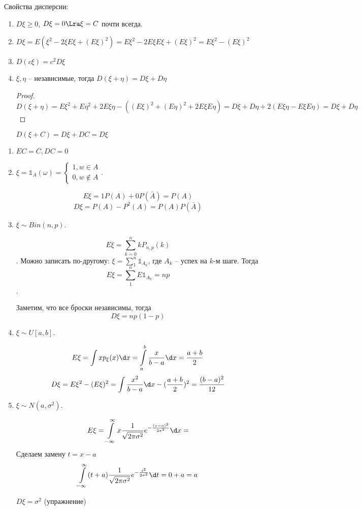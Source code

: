 Свойства дисперсии:
\begin{enumerate}
\item $D\xi \geq 0$, $D \xi = 0 \Lra \xi = C$ почти всегда. 

\item $D \xi = E (\xi ^2 - 2\xi E\xi + (E \xi) ^ 2) = E\xi^2 - 2E\xi E\xi + (E\xi) ^2 = E\xi^2 - (E\xi)^2$

\item $D(c \xi) = c^2 D \xi$

\item $\xi, \eta$ -- независимые, тогда $D(\xi + \eta) = D\xi + D\eta$
\begin{proof}
$$D(\xi + \eta) = E\xi^2 + E\eta^2 + 2E\xi\eta - ((E\xi)^2 + (E\eta)^2+ 2E\xi E\eta) = D\xi + D\eta + 2(E\xi \eta - E \xi E\eta) = D\xi + D\eta$$
\end{proof}
\begin{conseq}
$D(\xi + C) = D\xi + DC = D\xi$
\end{conseq}
\end{enumerate}

\begin{exmp}

\begin{enumerate}

\item $EC = C, DC = 0$
\item $\xi = \mathbb{1}_A(\omega) = \begin{cases} 1, w \in A \\ 0, w \notin A \end{cases}$.

$$E\xi = 1 P(A) + 0 P(\bar A) = P(A)$$
$$D\xi = P(A) - P^2(A) = P(A) P(\bar A)$$
\item $\xi \sim Bin(n, p)$. 

$$E\xi = \sum\limits_{k=0}^n k P_{n, p}(k)$$. 
Можно записать по-другому: $\xi = \sum\limits_1^n \mathbb{1}_{A_k}$, где $A_k$ -- успех на $k$-м шаге. Тогда $$E\xi = \sum\limits_1^n E \mathbb{1}_{A_k} = np$$.

Заметим, что все броски независимы, тогда 
$$D\xi = n p (1-p)$$

\item $\xi \sim U[a, b]$. 

$$E \xi = \int x p_\xi(x) \d x = \int\limits_a^b \frac{x}{b - a} \d x = \frac{a + b}{2}$$
$$D \xi = E\xi^2 - (E\xi)^2 = \int\frac{x^2}{b-a}\d x - (\frac{a + b}{2})^2 = \frac{(b - a)^2}{12}$$

\item
$\xi \sim N(a, \sigma^2)$.

$$E\xi = \int\limits_{-\infty}^{\infty} x \frac{1}{\sqrt{2\pi \sigma^2}} e^{-\frac{(x - a)^2}{2\sigma^2}} \d x = $$
Сделаем замену $t = x - a$
$$\int\limits_{-\infty}^\infty (t + a)\frac{1}{\sqrt{2\pi \sigma^2}} e^{-\frac{t^2}{2\sigma^2}} \d t = 0 + a = a$$

$D\xi = \sigma^2$ (упражнение)
\end{enumerate}
\end{exmp}


